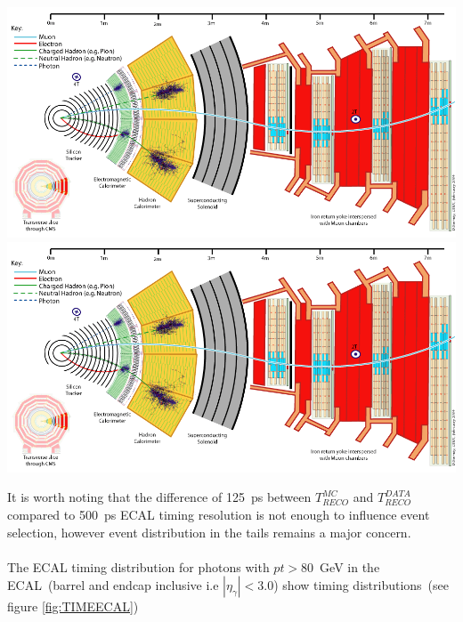 \begin{center}
\centering
\includegraphics[scale=0.2]{THESISPLOTS/CMS_Slice.png}
\includegraphics[scale=0.2]{THESISPLOTS/CMS_Slice.png}
\label{fig:TIME}
\end{center}

It is worth noting that the difference of 125~ps between $T^{MC}_{RECO}$ and $T^{DATA}_{RECO}$ compared to 500~ps ECAL timing resolution is not enough to influence event selection, however event distribution in the tails remains a major concern.
\paragraph*{}
The ECAL timing distribution for photons with $pt > 80$~GeV in the ECAL~(barrel and endcap inclusive i.e $|\eta_{\gamma}| < 3.0$) show timing distributions~(see figure \ref{fig:TIMEECAL})


